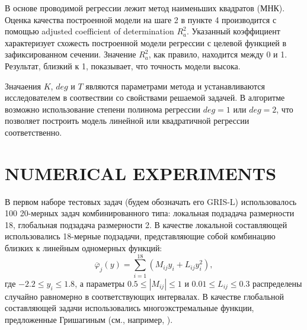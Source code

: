 \documentclass{aip-cp}
\begin{document}
%

В основе проводимой регрессии лежит метод наименьших квадратов (МНК). Оценка качества построенной модели на шаге 2 в пункте 4 производится с помощью adjusted coefficient of determination $R^2_a$. Указанный коэффициент характеризует схожесть построенной модели регрессии с целевой функцией в зафиксированном сечении. Значение $R^2_a$, как правило, находится между 0 и 1. Результат, близкий к 1, показывает, что точность модели высока.

Значаения  $K$, $deg$ и $T$ являются параметрами метода и устанавливаются исследователем в соотвествии со свойствами решаемой задачей. В алгоритме возможно использование степени полинома регрессии $deg = 1$ или $deg = 2$, что позволяет построить модель линейной или квадратичной регрессии соответственно.

\section{NUMERICAL EXPERIMENTS}

В первом наборе тестовых задач (будем обозначать его GRIS-L) использовалось 100 20-мерных задач комбинированного типа: локальная подзадача размерности 18, глобальная подзадача размерности 2. В качестве локальной составляющей использовались 18-мерные подзадачи, представляющие собой комбинацию близких к линейным одномерных функций:
\begin{equation}\label{X2_problem}
\overline{\varphi}_j(y) = \sum_{i=1}^{18} \left(M_{ij} y_i + L_{ij} y_i^2\right) ,
\end{equation}
где $-2.2 \leq y_i \leq 1.8$, а параметры $0.5 \leq |M_{ij}| \leq 1$ и $0.01 \leq L_{ij} \leq 0.3$  распределены случайно равномерно в соответствующих интервалах.
В качестве глобальной составляющей задачи использовались многоэкстремальные функции, предложенные Гришагиным (см., например, \cite{Grishagin1994}).
\end{document}
